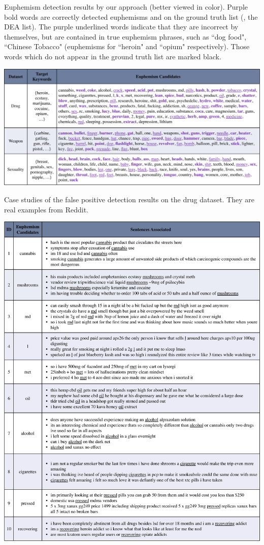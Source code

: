 
\newpage
\appendix

\begin{table}
	\centering
	\caption{Euphemism detection results by our approach (better viewed in color). 
		Purple bold words are correctly detected euphemisms and on the ground truth list (\ie, the DEA list). 
		The purple underlined words indicate that they are incorrect by themselves, but are contained in true euphemism phrases, such as ``dog food", ``Chinese Tobacco" (euphemisms for ``heroin" and ``opium" respectively). 
		Those words which do not appear in the ground truth list are marked black. 
		}
	\includegraphics[width=1\linewidth]{figures/CaseStudies-Detection}
	\label{fig:casestudies-detection}
\end{table}

\begin{table}
	\centering
	\caption{Case studies of the false positive detection results on the drug dataset. They are real examples from Reddit.}
	\includegraphics[width=0.96\linewidth]{figures/CaseStudies-Detection2}
	\label{fig:casestudies-detection2}
\end{table}

